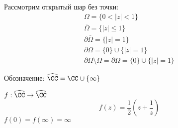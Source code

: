 \begin{exmpl}
    Рассмотрим открытый шар без точки:
    \begin{align*}
        \Omega = \{0 < |z| < 1\} \\ 
        \overline{\Omega} = \{|z| \leq 1\} \\ 
        \partial \overline{\Omega} = \{|z| = 1\} \\ 
        \partial \Omega = \{0\} \cup \{|z| = 1\} \\ 
        \partial \Omega \setminus \Omega = \partial \Omega = \{0\} \cup \{|z| = 1\}
    \end{align*}
\end{exmpl}
\begin{remrk}
    Обозначение: $\widehat{\CC} = \CC \cup \{\infty\}$
\end{remrk}
\begin{prop} 
    $f: \widehat{\CC} \to \widehat{\CC}$
    $$f(z) = \frac{1}{2}\left( z + \frac{1}{z} \right)$$
    $f(0) = f(\infty) = \infty$
\end{prop}
